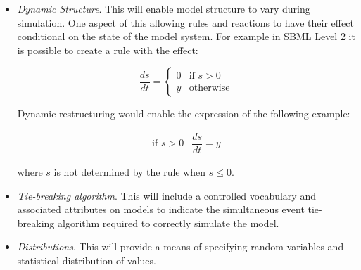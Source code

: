 \begin{itemize}
\item \emph{Dynamic Structure}.  This will enable model structure
  to vary during simulation.  One aspect of this allowing rules
  and reactions to have their effect conditional on the state of
  the model system.  For example in SBML Level 2 it is possible to
  create a rule with the effect:
\begin{linenomath}
\begin{equation*}
\frac{d s}{d t} =
\left\{
\begin{array}{ll}
     0 & \mbox{if $s>0$}\\
     y & \mbox{otherwise}
\end{array}
\right.
\end{equation*}
\end{linenomath}
Dynamic restructuring would enable the expression of the following example:
\begin{linenomath}
\begin{equation*}
\begin{array}{ll}
\mbox{if $s>0$} & \dfrac{d s}{d t} = y
\end{array}
\end{equation*}
\end{linenomath}
where $s$ is not determined by the rule when $s \leq 0$.

\item \emph{Tie-breaking algorithm}.  This will include a
  controlled vocabulary and associated attributes on models to
  indicate the simultaneous event tie-breaking algorithm required
  to correctly simulate the model.
  
\item \emph{Distributions}.  This will provide a means of
  specifying random variables and statistical distribution of
  values.

\end{itemize}




